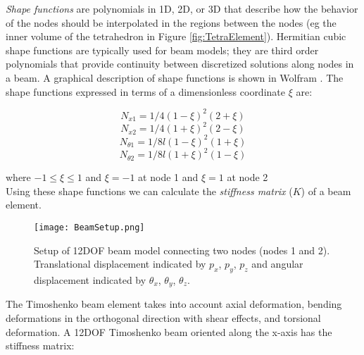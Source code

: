 {\textit{Shape functions} are polynomials in 1D, 2D, or 3D that describe how the behavior of the nodes should be interpolated in the regions between the nodes (eg the inner volume of the tetrahedron in Figure \ref{fig:TetraElement}).  Hermitian cubic shape functions are typically used for beam models; they are third order polynomials that provide continuity between discretized solutions along nodes in a beam.  A graphical description of shape functions is shown in Wolfram \cite{Wolfram2016}.  The shape functions expressed in terms of a dimensionless coordinate $\xi$ are:

\[ N_{x1} = 1/4(1-\xi)^2(2+\xi) \]
\[ N_{x2} = 1/4(1+\xi)^2(2-\xi) \]
\[ N_{\theta1} = 1/8l(1-\xi)^2(1+\xi) \]
\[ N_{\theta2} = 1/8l(1+\xi)^2(1-\xi) \]

where $-1 \leq \xi \leq 1$ and $\xi = -1$ at node 1 and $\xi = 1$ at node 2\\

Using these shape functions we can calculate the \textit{stiffness matrix} ($K$) of a beam element.  


\begin{figure}
  \texttt{[image: BeamSetup.png]}
  \caption{Setup of 12DOF beam model connecting two nodes (nodes 1 and 2).  Translational displacement indicated by $p_x$, $p_y$, $p_z$ and angular displacement indicated by $\theta_x$, $\theta_y$, $\theta_z$.}
  \label{fig:BeamSetup}
\end{figure}

The Timoshenko beam element takes into account axial deformation, bending deformations in the orthogonal direction with shear effects, and torsional deformation.  A 12DOF Timoshenko beam oriented along the x-axis has the stiffness matrix:\\

}
